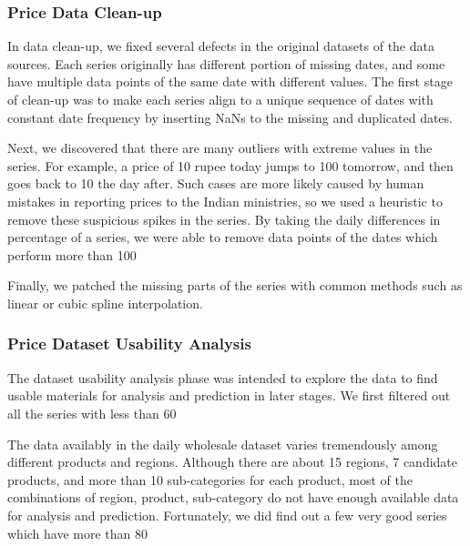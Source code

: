 \subsubsection*{Price Data Clean-up}
In data clean-up, we fixed several defects in the original datasets of the data sources. Each series originally has different portion of missing dates, and some have multiple data points of the same date with different values. The first stage of clean-up was to make each series align to a unique sequence of dates with constant date frequency by inserting NaNs to the missing and duplicated dates.

Next, we discovered that there are many outliers with extreme values in the series. For example, a price of 10 rupee today jumps to 100 tomorrow, and then goes back to 10 the day after. Such cases are more likely caused by human mistakes in reporting prices to the Indian ministries, so we used a heuristic to remove these suspicious spikes in the series. By taking the daily differences in percentage of a series, we were able to remove data points of the dates which perform more than 100%

Finally, we patched the missing parts of the series with common methods such as linear or cubic spline interpolation.

\subsubsection*{Price Dataset Usability Analysis}

The dataset usability analysis phase was intended to explore the data to find usable materials for analysis and prediction in later stages. We first filtered out all the series with less than 60%

The data availably in the daily wholesale dataset varies tremendously among different products and regions. Although there are about 15 regions, 7 candidate products, and more than 10 sub-categories for each product, most of the combinations of region, product, sub-category do not have enough available data for analysis and prediction. Fortunately, we did find out a few very good series which have more than 80%

